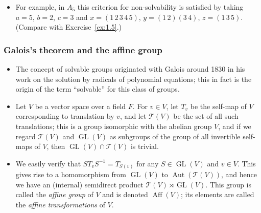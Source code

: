 \documentclass[../Odyssey_Project.tex]{subfiles}
\begin{document}
\begin{itemize}
    \item For example, in $A_5$ this criterion for non-solvability is satisfied by taking $a = 5$, $b = 2$, $c = 3$ and $x = (1\,2\,3\,4\,5)$, $y = (1\,2)(3\,4)$, $z = (1\,3\,5)$. (Compare with Exercise~\ref{ex:1.5}.)
\end{itemize}

\subsubsection*{Galois's theorem and the affine group}
\begin{itemize}
    \item The concept of solvable groups originated with Galois around 1830 in his work on the solution by radicals of polynomial equations; this in fact is the origin of the term ``solvable'' for this class of groups.
    \item Let $V$ be a vector space over a field $F$. For $v \in V$, let $T_v$ be the self-map of $V$ corresponding to translation by $v$, and let $\mathcal{T}(V)$ be the set of all such translations; this is a group isomorphic with the abelian group $V$, and if we regard $\mathcal{T}(V)$ and $\operatorname{GL}(V)$ as subgroups of the group of all invertible self-maps of $V$, then $\operatorname{GL}(V) \cap \mathcal{T}(V)$ is trivial.
    \item We easily verify that $S T_v S^{-1} = T_{S(v)}$ for any $S \in \operatorname{GL}(V)$ and $v \in V$. This gives rise to a homomorphism from $\operatorname{GL}(V)$ to $\operatorname{Aut}(\mathcal{T}(V))$, and hence we have an (internal) semidirect product $\mathcal{T}(V) \rtimes \operatorname{GL}(V)$. This group is called the \emph{affine group} of $V$ and is denoted $\operatorname{Aff}(V)$; its elements are called the \emph{affine transformations} of $V$.
\end{itemize}
\end{document}
